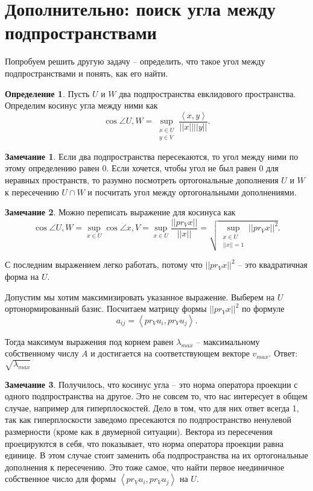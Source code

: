 \documentclass[10pt,a4paper,oneside]{book}
\theoremstyle{definition}
\newtheorem*{rem}{Замечание}
\newtheorem*{defn}{{\color{yellow!20!red} Определение}}
\def\lan{\left\langle }
\def\ran{\right\rangle}
\def\dfn{\begin{defn}}
\def\edfn{\end{defn}}
\def\rm{\begin{rem}}
\def\erm{\end{rem}}
\begin{document}
\section*{Дополнительно: поиск угла между подпространствами}
Попробуем решить другую задачу -- определить, что такое угол между подпространствами и понять, как его найти. 

\dfn
Пусть $U$ и $W$ два подпространства  евклидового пространства. Определим косинус угла между ними как 
$$\cos \angle U,W= \sup_{\substack{ x\in U\\ y\in V}} \frac{\lan x,y\ran}{||x|| ||y||}.$$
\edfn

\rm Если два подпространства пересекаются, то угол между ними по этому определению равен 0. Если хочется, чтобы угол не был равен 0 для неравных пространств, то разумно посмотреть ортогональные дополнения $U$ и $W$ к пересечению $U\cap W$ и посчитать угол между ортогональными дополнениями. 
\erm

\rm Можно переписать выражение для косинуса как $$\cos \angle U,W= \sup_{ x\in U} \cos \angle x, V = \sup_{x\in U} \frac{||pr_V x||}{||x||}= \sqrt{ \sup_{\substack{x\in U\\ ||x||=1}} ||pr_V x||^2} .$$
\erm

С последним выражением легко работать, потому что $||pr_V x||^2$ -- это квадратичная форма на $U$.

Допустим мы хотим максимизировать указанное выражение. Выберем на $U$ ортонормированный базис. Посчитаем матрицу формы $||pr_V x||^2$ по формуле 
$$a_{ij}= \lan pr_V u_i, pr_V u_j\ran.$$

Тогда максимум выражения под корнем равен $\lambda_{max}$ -- максимальному собственному числу $A$ и достигается на соответствующем векторе $v_{max}$. Ответ: $\sqrt{\lambda_{max}}$

\rm Получилось, что косинус угла -- это норма оператора проекции с одного подпространства на другое. Это не совсем то, что нас интересует в общем случае, например для гиперплоскостей. Дело в том, что для них ответ всегда 1, так как гиперплоскости заведомо пресекаются по подпространство ненулевой размерности (кроме как в двумерной ситуации). Вектора из пересечения проецируются в себя, что показывает, что норма оператора проекции равна единице. В этом случае стоит заменить оба подпространства на их ортогональные дополнения к пересечению. Это тоже самое, что найти первое неединичное собственное число для формы  $\lan pr_V u_i, pr_V u_j\ran$ на $U$.
\erm
\end{document}
